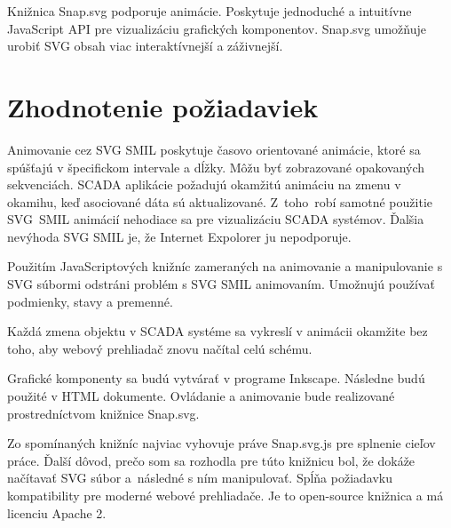 Knižnica Snap.svg podporuje animácie. Poskytuje jednoduché a intuitívne JavaScript API pre vizualizáciu grafických komponentov. Snap.svg umožňuje urobiť SVG obsah viac interaktívnejší a záživnejší. \cite{snapsvg}

\section{Zhodnotenie požiadaviek}

Animovanie cez SVG \acs{SMIL} poskytuje  časovo orientované animácie, ktoré sa spúšťajú v špecifickom intervale a dĺžky. Môžu byť  zobrazované opakovaných sekvenciách. SCADA aplikácie požadujú okamžitú animáciu na zmenu v okamihu, keď  asociované dáta sú aktualizované. Z~toho~robí samotné použitie SVG~SMIL animácií nehodiace sa pre vizualizáciu SCADA systémov. Ďalšia nevýhoda SVG SMIL je, že Internet Expolorer ju nepodporuje.

Použitím JavaScriptových knižníc zameraných na animovanie a manipulovanie s SVG súbormi odstráni problém s SVG SMIL animovaním. Umožnujú používať podmienky, stavy a premenné.

Každá zmena objektu v SCADA systéme sa vykreslí v animácii okamžite bez toho, aby webový prehliadač znovu načítal celú schému. 

Grafické komponenty sa budú vytvárať v programe Inkscape. Následne budú použité v HTML dokumente. Ovládanie a animovanie bude realizované prostredníctvom knižnice Snap.svg. 

Zo spomínaných knižníc najviac vyhovuje práve Snap.svg.js pre splnenie cieľov práce. Ďalší dôvod, prečo som sa rozhodla pre túto  knižnicu bol, že dokáže načítavať SVG súbor a~následné s ním manipulovať. Spĺňa požiadavku kompatibility pre moderné webové prehliadače. Je to open-source knižnica a má licenciu Apache 2.